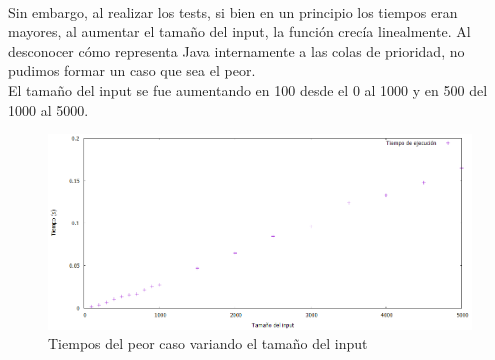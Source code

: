 \documentclass{article}
\begin{document}
	\\Sin embargo, al realizar los tests, si bien en un principio los tiempos eran mayores, al aumentar el tama\~no  del input, la funci\'on crec\'ia linealmente. Al desconocer c\'omo representa Java internamente a las colas de prioridad, no pudimos formar un caso que sea el peor.
	\\El tama\~no del input se fue aumentando en 100 desde el 0 al 1000 y en 500 del 1000 al 5000.
	\begin{figure}
  		\centering
   	 	\includegraphics[width=1\textwidth]
   	 	{Imagenes/medianaPeorTiempos.png}
		\caption{Tiempos del peor caso variando el tama\~no del input}
	\end{figure}
\end{document}
